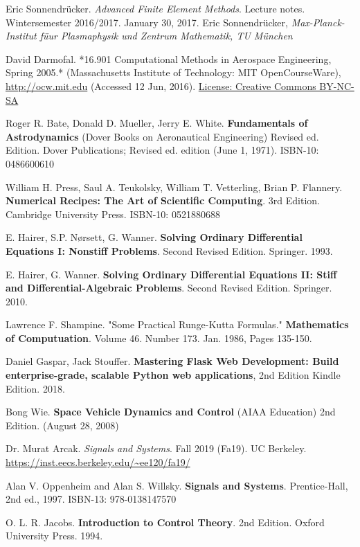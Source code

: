 \documentclass[10pt]{amsart}
\begin{document}
\begin{thebibliography}{9}
Eric Sonnendr\"{u}cker.  \emph{Advanced Finite Element Methods}.  Lecture notes.  Wintersemester 2016/2017.  January 30, 2017.  Eric Sonnendr\"{u}cker, \emph{Max-Planck-Institut f\"{u}ur Plasmaphysik und Zentrum Mathematik, TU M\"{u}nchen}

  David Darmofal. *16.901 Computational Methods in Aerospace Engineering, Spring 2005.* (Massachusetts Institute of Technology: MIT OpenCourseWare), \url{http://ocw.mit.edu} (Accessed 12 Jun, 2016). \href{http://creativecommons.org/licenses/by-nc-sa/4.0/}{License: Creative Commons BY-NC-SA}

Roger R. Bate, Donald D. Mueller, Jerry E. White. \textbf{Fundamentals of Astrodynamics} (Dover Books on Aeronautical Engineering) Revised ed. Edition. Dover Publications; Revised ed. edition (June 1, 1971). ISBN-10: 0486600610

William H. Press, Saul A. Teukolsky, William T. Vetterling, Brian P. Flannery. \textbf{Numerical Recipes: The Art of Scientific Computing}. 3rd Edition.  Cambridge University Press.  ISBN-10: 0521880688

E. Hairer, S.P. N\o rsett, G. Wanner. \textbf{Solving Ordinary Differential Equations I: Nonstiff Problems}. Second Revised Edition. Springer. 1993. 

E. Hairer, G. Wanner. \textbf{Solving Ordinary Differential Equations II: Stiff and Differential-Algebraic Problems}. Second Revised Edition. Springer. 2010.

Lawrence F. Shampine. "Some Practical Runge-Kutta Formulas." \textbf{Mathematics of Computuation}. Volume 46. Number 173. Jan. 1986, Pages 135-150.

Daniel Gaspar, Jack Stouffer.
\textbf{Mastering Flask Web Development: Build enterprise-grade, scalable Python web applications}, 2nd Edition Kindle Edition. 2018.

Bong Wie. \textbf{Space Vehicle Dynamics and Control} (AIAA Education) 2nd Edition. (August 28, 2008)

Dr. Murat Arcak. \emph{Signals and Systems}. Fall 2019 (Fa19). UC Berkeley. \url{https://inst.eecs.berkeley.edu/~ee120/fa19/}

Alan V. Oppenheim and Alan S. Willsky. \textbf{Signals and Systems}. Prentice-Hall, 2nd ed., 1997.  ISBN-13: 978-0138147570 

O. L. R. Jacobs. \textbf{Introduction to Control Theory}. 2nd Edition. Oxford University Press. 1994.


\end{thebibliography}
\end{document}
